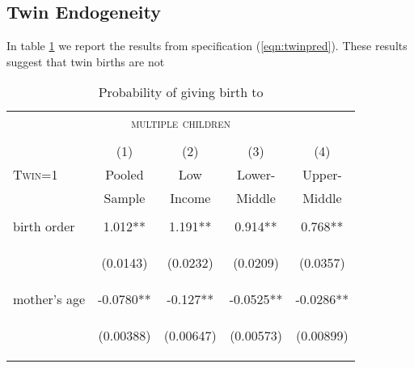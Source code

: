 \documentclass{article}[11pt,subeqn]
\begin{document}
\begin{spacing}{1.5}
\subsection{Twin Endogeneity}
\label{scn:twinendog}
In table \ref{tab:twinreg1} we report the results from specification (\ref{eqn:twinpred}). These results suggest that twin births are not 
\begin{table}[htpb!]
\caption{Probability of giving birth to}
\vspace{-7mm}
\label{tab:twinreg1}
\begin{center}
\begin{tabular}{lcccc} 
\multicolumn{5}{c}{\textsc{multiple children}}\\
& & \\
\toprule
 & (1) & (2) & (3) & (4) \\
\textsc{Twin=1} & Pooled & Low & Lower- & Upper- \\ 
 & Sample & Income & Middle & Middle \\  \midrule
\vspace{4pt} & \begin{footnotesize}\end{footnotesize} & \begin{footnotesize}\end{footnotesize} & \begin{footnotesize}\end{footnotesize} & \begin{footnotesize}\end{footnotesize} \\
birth order & 1.012** & 1.191** & 0.914** & 0.768** \\
\vspace{4pt} & \begin{footnotesize}(0.0143)\end{footnotesize} & \begin{footnotesize}(0.0232)\end{footnotesize} & \begin{footnotesize}(0.0209)\end{footnotesize} & \begin{footnotesize}(0.0357)\end{footnotesize} \\
mother's age & -0.0780** & -0.127** & -0.0525** & -0.0286** \\
\vspace{4pt} & \begin{footnotesize}(0.00388)\end{footnotesize} & \begin{footnotesize}(0.00647)\end{footnotesize} & \begin{footnotesize}(0.00573)\end{footnotesize} & \begin{footnotesize}(0.00899)\end{footnotesize} \\

\end{tabular}
\end{center}
\end{table}
\end{spacing}
\end{document}
